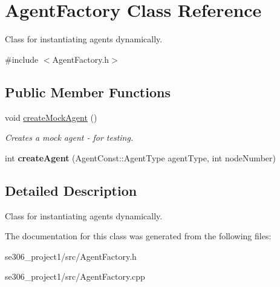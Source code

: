 \hypertarget{classAgentFactory}{\section{Agent\-Factory Class Reference}
\label{classAgentFactory}
}


Class for instantiating agents dynamically.  




{\ttfamily \#include $<$Agent\-Factory.\-h$>$}

\subsection*{Public Member Functions}
\begin{DoxyCompactItemize}
\item 
\hypertarget{classAgentFactory_a8785d71f067068f09326b4c5af5007b4}{void \hyperlink{classAgentFactory_a8785d71f067068f09326b4c5af5007b4}{create\-Mock\-Agent} ()}\label{classAgentFactory_a8785d71f067068f09326b4c5af5007b4}

\begin{DoxyCompactList}\small\item\em Creates a mock agent -\/ for testing. \end{DoxyCompactList}\item 
\hypertarget{classAgentFactory_aa8899b46f620a9a31f3e40041759ae24}{int {\bfseries create\-Agent} (Agent\-Const\-::\-Agent\-Type agent\-Type, int node\-Number)}\label{classAgentFactory_aa8899b46f620a9a31f3e40041759ae24}

\end{DoxyCompactItemize}


\subsection{Detailed Description}
Class for instantiating agents dynamically. 

The documentation for this class was generated from the following files\-:\begin{DoxyCompactItemize}
\item 
se306\-\_\-project1/src/Agent\-Factory.\-h\item 
se306\-\_\-project1/src/Agent\-Factory.\-cpp\end{DoxyCompactItemize}
